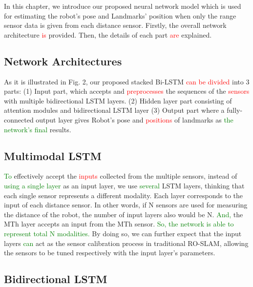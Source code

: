 \documentclass[letterpaper, 10 pt, conference]{ieeeconf}  %
\begin{document}
In this chapter, we introduce our proposed neural network model which is used for estimating the robot’s pose and Landmarks’ position when only the range sensor data is given from each distance sensor. Firstly, the overall network architecture \textcolor{red}{is} provided. Then, the details of each part \textcolor{red}{are} explained.   

\subsection{Network Architectures}

As it is illustrated in Fig. 2, our proposed stacked Bi-LSTM \textcolor{red}{can be divided} into 3 parts: (1) Input part, which accepts and \textcolor{red}{preprocesses} the sequences of the \textcolor{red}{sensors} with multiple bidirectional LSTM layers. (2) Hidden layer part consisting of attention modules and bidirectional LSTM layer (3) Output part where a fully-connected output layer gives Robot’s pose and \textcolor{red}{positions} of landmarks as \textcolor{green}{the network's final} results. 

\subsection{Multimodal LSTM}

\textcolor{green}{To} effectively accept the \textcolor{red}{inputs} collected from the multiple sensors, instead of \textcolor{green}{using a single layer} as an input layer, we use \textcolor{green}{several} LSTM layers, thinking that each single sensor represents a different modality. Each layer corresponds to the input of each distance sensor. In other words, if N sensors are used for measuring the distance of the robot, the number of input layers also would be N. \textcolor{green}{And,} the MTh layer accepts an input from the MTh sensor. \textcolor{green}{So, the network is able to represent total N modalities.} By doing so, we can further expect that the input layers \textcolor{green}{can} act as the sensor calibration process in traditional RO-SLAM, allowing the sensors to be tuned respectively with the input layer’s parameters.

\subsection{Bidirectional LSTM}
\end{document}
